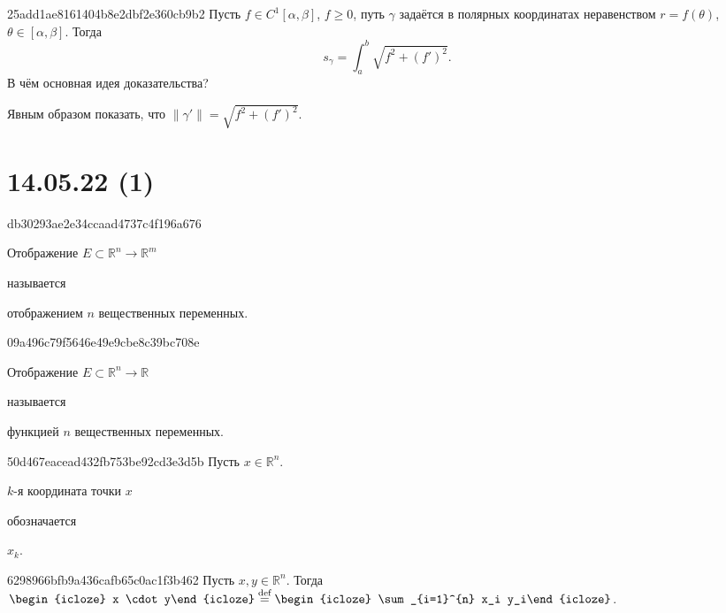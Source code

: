 \begin{note}{25add1ae8161404b8e2dbf2e360cb9b2}
    Пусть \({ f \in C^{1}[\alpha, \beta] }\), \({ f \geqslant 0 }\), путь \({ \gamma }\) задаётся в полярных координатах неравенством \({ r = f(\theta) }\),\: \({ \theta \in [\alpha, \beta] }\). Тогда
    \[
        s_\gamma = \int_{a}^{b} \sqrt{f^2 + (f')^2}.
    \]
    В чём основная идея доказательства?

    \begin{cloze}{1}
        Явным образом показать, что \({ \left\lVert \gamma' \right\rVert = \sqrt{f^2 + (f')^2} }\).
    \end{cloze}
\end{note}

\section{14.05.22 (1)}
\begin{note}{db30293ae2e34ccaad4737c4f196a676}
    \begin{icloze}{2}Отображение \({ E \subset \mathbb R^{n} \to \mathbb R^{m} }\)\end{icloze} называется \begin{icloze}{1}отображением \({ n }\) вещественных переменных.\end{icloze}
\end{note}

\begin{note}{09a496c79f5646e49e9cbe8c39bc708e}
    \begin{icloze}{2}Отображение \({ E \subset \mathbb R^{n} \to \mathbb R }\)\end{icloze} называется \begin{icloze}{1}функцией \({ n }\) вещественных переменных.\end{icloze}
\end{note}

\begin{note}{50d467eacead432fb753be92cd3e3d5b}
    Пусть \({ x \in \mathbb R^{n} }\). \begin{icloze}{2}\({ k }\)-я координата точки \({ x }\)\end{icloze} обозначается \begin{icloze}{1}\({ x_k }\).\end{icloze}
\end{note}

\begin{note}{6298966bfb9a436cafb65c0ac1f3b462}
    Пусть \({ x, y \in \mathbb R^{n} }\).
    Тогда \({ \displaystyle \begin{icloze}{2}x \cdot y\end{icloze} \overset{\text{def}}= \begin{icloze}{1}\sum_{i=1}^{n} x_i y_i\end{icloze} }\).
\end{note}

